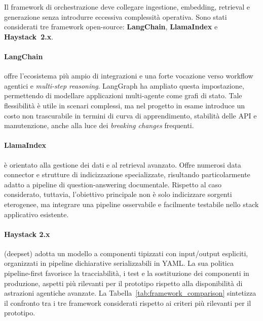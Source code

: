 Il framework di orchestrazione deve collegare ingestione, embedding, retrieval
e generazione senza introdurre eccessiva complessità operativa. Sono stati
considerati tre framework open-source: \textbf{LangChain},
\textbf{LlamaIndex} e \textbf{Haystack~2.x}.

\paragraph{LangChain} offre l'ecosistema più ampio di integrazioni e una forte
vocazione verso workflow agentici e \textit{multi-step reasoning}. LangGraph ha
ampliato questa impostazione, permettendo di modellare applicazioni multi-agente
come grafi di stato. Tale flessibilità è utile in scenari complessi, ma nel progetto
in esame introduce un costo non trascurabile in termini di curva di
apprendimento, stabilità delle API e manutenzione, anche alla luce dei
\textit{breaking changes} frequenti.

\paragraph{LlamaIndex} è orientato alla gestione dei dati e al retrieval
avanzato. Offre numerosi data connector e strutture di indicizzazione
specializzate, risultando particolarmente adatto a pipeline di
question-answering documentale. Rispetto al caso
considerato, tuttavia, l'obiettivo principale non è solo indicizzare sorgenti
eterogenee, ma integrare una pipeline osservabile e facilmente testabile nello
stack applicativo esistente.

\paragraph{Haystack 2.x} (deepset) adotta un modello a componenti tipizzati
con input/output espliciti, organizzati in pipeline dichiarative serializzabili
in YAML. La sua politica pipeline-first favorisce la tracciabilità, i test e
la sostituzione dei componenti in produzione, aspetti più rilevanti per il
prototipo rispetto alla disponibilità di astrazioni agentiche avanzate.
La Tabella~\ref{tab:framework_comparison} sintetizza il confronto tra i tre
framework considerati rispetto ai criteri più rilevanti per il prototipo.

